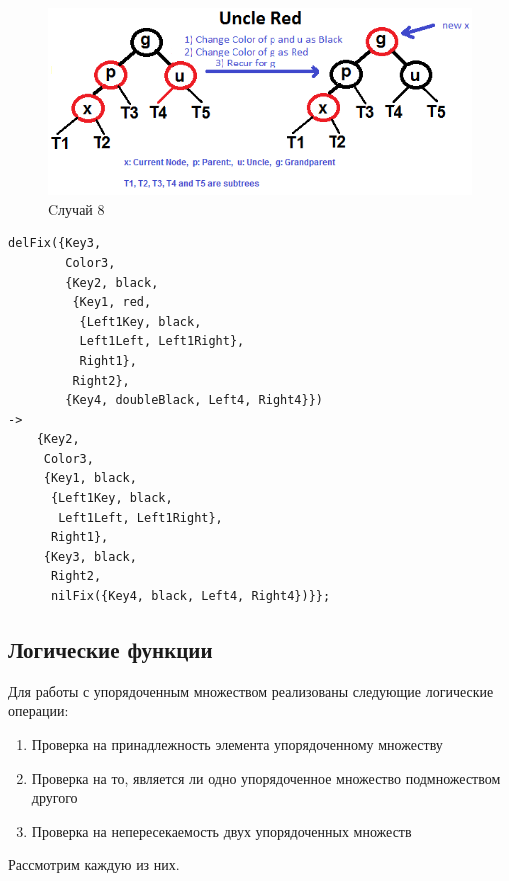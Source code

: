 			\begin{figure}[H]
				\centering
				\includegraphics[width=\textwidth]{img/tan-aus.png}
				\caption{Cлучай 8}
			\end{figure}
			\begin{lstlisting}
delFix({Key3,																		
        Color3,																		
        {Key2, black, 
         {Key1, red, 
          {Left1Key, black, 
          Left1Left, Left1Right}, 
          Right1}, 													
		 Right2},														
		{Key4, doubleBlack, Left4, Right4}})																			
->																					
    {Key2,																			
     Color3,																		
     {Key1, black, 
      {Left1Key, black, 
       Left1Left, Left1Right}, 
      Right1},															
	 {Key3, black, 
	  Right2, 
	  nilFix({Key4, black, Left4, Right4})}};																				
			\end{lstlisting}
			
			
	\subsection{Логические функции}
		Для работы с упорядоченным множеством реализованы следующие логические операции:
		\begin{enumerate}
			\item Проверка на принадлежность элемента упорядоченному множеству
			\item Проверка на то, является ли одно упорядоченное множество
				  подмножеством другого
			\item Проверка на непересекаемость двух упорядоченных множеств
		\end{enumerate} 
		Рассмотрим каждую из них.
		
